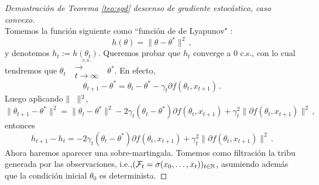 \begin{proof}[Demostración de Teorema \ref{teo:sgd} descenso de gradiente estocástico, caso convexo]
\gris \\ Tomemos la función  siguiente como “funci\'on de de Lyapunov" :
$$ h(\theta) = \|\theta-\theta^*\|^2\, , $$
y denotemos $h_t:=h(\theta_t)$. Queremos probar que $h_t$ converge a $0$ c.s., con lo cual tendremos que $\theta_t\mbox{ }\overset{c.s.}{\substack{\longrightarrow \\t \to \infty}}\mbox{ }\theta^*$. En efecto,
$$ \theta_{t+1}-\theta^* = \theta_t-\theta^*-\gamma_t\partial f(\theta_t,x_{t+1}) \,.$$
Luego aplicando $\|\hspace{.25cm}\,\|^2$,
$$ \|\theta_{t+1}-\theta^*\|^2 = \|\theta_t-\theta^*\|^2-2\gamma_t(\theta_t-\theta^*)\partial f(\theta_{t},x_{t+1})+\gamma^2_t\|\partial f(\theta_t,x_{t+1})\|^2 \,,$$
entonces
$$ h_{t+1}-h_t = -2\gamma_t(\theta_t-\theta^*)\partial f(\theta_t,x_{t+1})+\gamma_t^2\|\partial f(\theta_t,x_{t+1})\|^2 \, .$$
Ahora haremos aparecer una sobre-martingala. Tomemos como filtración la tribu generada por las observaciones, i.e.,$ (\mathcal{F}_t=\sigma(x_0,\dots,x_t))_{t\in\mathbb{N}}$, asumiendo adem\'as que la condici\'on inicial $\theta_0$ es determinista. 


\end{proof}
